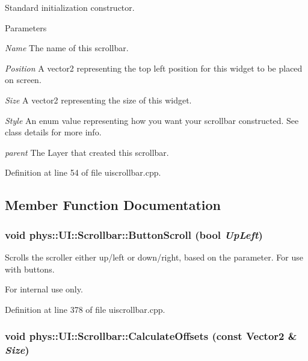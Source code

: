 Standard initialization constructor. 


\begin{DoxyParams}{Parameters}
\item[{\em Name}]The name of this scrollbar. \item[{\em Position}]A vector2 representing the top left position for this widget to be placed on screen. \item[{\em Size}]A vector2 representing the size of this widget. \item[{\em Style}]An enum value representing how you want your scrollbar constructed. See class details for more info. \item[{\em parent}]The Layer that created this scrollbar. \end{DoxyParams}


Definition at line 54 of file uiscrollbar.cpp.



\subsection{Member Function Documentation}
\hypertarget{classphys_1_1UI_1_1Scrollbar_a31a2e11f27f087154fd61d7cc2cd6dc1}{
\subsubsection[{ButtonScroll}]{\setlength{\rightskip}{0pt plus 5cm}void phys::UI::Scrollbar::ButtonScroll (bool {\em UpLeft})}}
\label{d0/d3e/classphys_1_1UI_1_1Scrollbar_a31a2e11f27f087154fd61d7cc2cd6dc1}


Scrolls the scroller either up/left or down/right, based on the parameter. For use with buttons. 

\begin{DoxyInternal}{For internal use only.}
\end{DoxyInternal}


Definition at line 378 of file uiscrollbar.cpp.

\hypertarget{classphys_1_1UI_1_1Scrollbar_a4621d6713a059196f1a358a23b9ad5ae}{
\subsubsection[{CalculateOffsets}]{\setlength{\rightskip}{0pt plus 5cm}void phys::UI::Scrollbar::CalculateOffsets (const {\bf Vector2} \& {\em Size})}}
\label{d0/d3e/classphys_1_1UI_1_1Scrollbar_a4621d6713a059196f1a358a23b9ad5ae}


